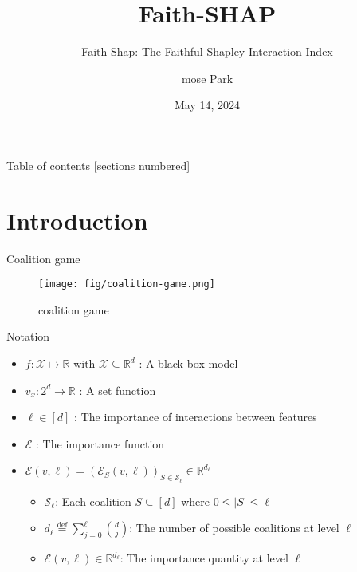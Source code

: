 \documentclass[10pt]{beamer}
\title{Faith-SHAP}
\subtitle{Faith-Shap: The Faithful Shapley Interaction Index}
\date{May 14, 2024}
\author{mose Park}
\institute{    Department of Statistical Data Science \\
    University of Seoul}
\newcommand{\f}{v}
\newcommand{\x}{x}
\newcommand{\ex}{\Expl}
\def\Expl{\mathcal{E}}
\newcommand*{\defeq}{\stackrel{\text{def}}{=}}
\begin{document}
\maketitle

\begin{frame}{Table of contents}
  [sections numbered]
  \tableofcontents%
\end{frame}


\section[Intro]{Introduction}


\begin{frame}{Coalition game}

\begin{figure}[h]
\centering
\texttt{[image: fig/coalition-game.png]}
\caption{coalition game}
\label{fig:coalition-game}
\end{figure}
  
\end{frame}


\def\model{f}
\def\X{\mathcal{X}}
\def\R{\mathbb{R}}
\begin{frame}{Notation}

\begin{itemize}
    \item $\model : \X \mapsto \mathbb{R}$ with $\X \subseteq \R^d$ : A black-box model
    \vspace{2mm}
    \item $\f_{\x} : 2^d \rightarrow \mathbb{R}$ : A set function
    \vspace{2mm}
    \item $\ell \in [d]$ : The importance of interactions between features
    \vspace{2mm}
    \item $\ex$ : The importance function
    \vspace{2mm}
    \item $\ex(\f, \ell) = (\ex_{S}(\f, \ell))_{S \in \mathcal{S}_\ell} \in \R^{d_\ell}$
    \vspace{2mm}
    \begin{itemize}
      \item $\mathcal{S}_\ell$: Each coalition $S \subseteq [d]$ where $0 \leq |S| \leq \ell$
      \vspace{2mm}
      \item $d_{\ell} \defeq \sum_{j=0}^{\ell} { d \choose j}$: The number of possible coalitions at level $\ell$
      \vspace{2mm}
      \item $\ex(\f, \ell) \in \R^{d_\ell}$: The importance quantity at level $\ell$
    \end{itemize}
\end{itemize}

\end{frame}
\end{document}
